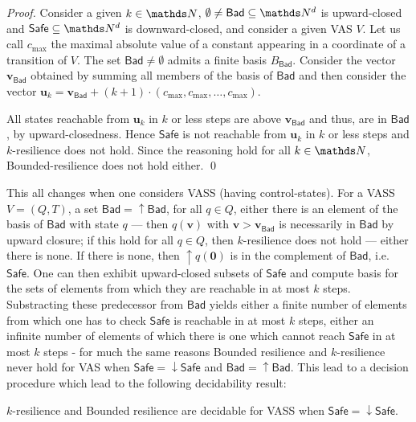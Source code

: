 \documentclass[runningheads]{llncs}
\newcommand{\Bad}{\textsf{Bad}}
\newcommand{\Safe}{\textsf{Safe}}
\begin{document}
\begin{proof}
Consider a given $k \in \N$,
 $\emptyset \neq \Bad \subseteq \N^d$ is upward-closed and $\Safe \subseteq \N^d$ is downward-closed, and
consider a given VAS $V$.
Let us call $c_{\max}$ the maximal absolute value of a constant appearing in a coordinate of a transition of $V$.
The set $\Bad \neq \emptyset$ admits a finite basis $B_\Bad$.
Consider the vector $\textbf{v}_{\Bad}$ obtained by summing all members of the basis of $\Bad$ and then consider the vector
$\textbf{u}_k = \textbf{v}_{\Bad} + (k+1) \cdot (c_{\max}, c_{\max}, \ldots, c_{\max})$.

All states reachable from $\textbf{u}_k$ in $k$ or less steps are above $ \textbf{v}_{\Bad} $
and thus, are in $\Bad$, by upward-closedness.
Hence  $\Safe$ is not reachable from $\textbf{u}_k$ in $k$ or less steps  and {$k$-resilience} does not hold.
Since the reasoning hold for all $k \in \N$, {\sc Bounded-resilience} does not hold either.
\qed
\end{proof}

This all changes when one considers VASS (having control-states). For a VASS $V = (Q,T)$, a set $\Bad = \mathop{\uparrow} \Bad$, for all $q \in Q$, either there is an element of the basis of $\Bad$ with state $q$ \----
then $q(\textbf{v})$ with $\textbf{v} > \textbf{v}_{\Bad}$ is necessarily in $\Bad$ by upward closure; if this hold for all $q \in Q$, then $k$-resilience does not hold \---- either there is none. If there is none, then 
$\mathop{\uparrow} q(\textbf{0})$
 is in the complement of $\Bad$, i.e. $\Safe$. One can then exhibit upward-closed subsets of 
 $\Safe$ and compute basis for the sets of elements from which they are reachable in at most $k$ steps. 
Substracting these predecessor from $\Bad$ yields either a finite number of elements from which one has to check $\Safe$ is reachable in at most $k$ steps, either an infinite number of elements of which there is one which cannot reach $\Safe$ in at most $k$ steps \-- for much the same reasons {\sc Bounded resilience} and {\sc $k$-resilience} never hold for VAS when $\Safe = \mathop{\downarrow} \Safe$ and $\Bad = \mathop{\uparrow} \Bad$. This lead to a decision procedure
 which lead to the following decidability result:
\begin{theorem}\label{vass down}
{\sc $k$-resilience }  and {\sc Bounded resilience} are decidable for VASS when 
$\Safe = \mathop{\downarrow} \Safe$.
\end{theorem}
\end{document}
